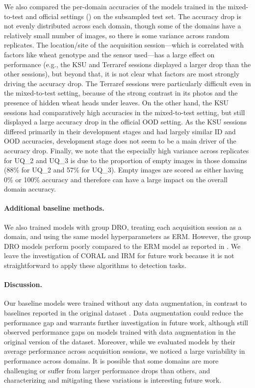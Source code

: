 We also compared the per-domain accuracies of the models trained in the mixed-to-test and official settings () on the subsampled test set.
The accuracy drop is not evenly distributed across each domain, though some of the domains have a relatively small number of images, so there is some variance across random replicates.
The location/site of the acquisition session---which is correlated with factors like wheat genotype and the sensor used---has a large effect on performance (e.g., the KSU and Terraref sessions displayed a larger drop than the other sessions), but beyond that, it is not clear what factors are most strongly driving the accuracy drop.
The Terraref sessions were particularly difficult even in the mixed-to-test setting, because of the strong contrast in its photos and the presence of hidden wheat heads under leaves.
On the other hand, the KSU sessions had comparatively high accuracies in the mixed-to-test setting, but still displayed a large accuracy drop in the official OOD setting.
As the KSU sessions differed primarily in their development stages and had largely similar ID and OOD accuracies, development stage does not seem to be a main driver of the accuracy drop.
Finally, we note that the especially high variance across replicates for UQ\_2 and UQ\_3 is due to the proportion of empty images in those domains (88\% for UQ\_2 and 57\% for UQ\_3). Empty images are scored as either having 0\% or 100\% accuracy and therefore can have a large impact on the overall domain accuracy.

\paragraph{Additional baseline methods.}
We also trained models with group DRO, treating each acquisition session as a domain, and using the same model hyperparameters as ERM.
However, the group DRO models perform poorly compared to the ERM model as reported in .
We leave the investigation of CORAL and IRM for future work because it is not straightforward to apply these algorithms to detection tasks.

\paragraph{Discussion.}
Our baseline models were trained without any data augmentation, in contrast to baselines reported in the original dataset \citep{david2020global}.
Data augmentation could reduce the performance gap and warrants further investigation in future work, although \citet{david2020global} still observed performance gaps on models trained with data augmentation in the original version of the dataset.
Moreover, while we evaluated models by their average performance across acquisition sessions, we noticed a large variability in performance across domains.
It is possible that some domains are more challenging or suffer from larger performance drops than others, and characterizing and mitigating these variations is interesting future work.


